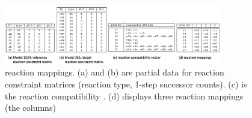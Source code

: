 \documentclass[webpdf,contemporary,large]{oup-authoring-template}
\newcommand{\revision}[1]{\color{red}{#1 }\color{black}}
\newcommand{\revisionb}[1]{\color{red}{#1}\color{black}}
\theoremstyle{thmstyleone}%
\theoremstyle{thmstyletwo}%
\theoremstyle{thmstylethree}%
\begin{document}
\begin{figure}
\centering
\includegraphics[width=0.85\textwidth,angle=0]{figures/constraint-data.png}
\caption{\revision{Illustration of calculating} reaction mappings.
(a) and (b) are partial data for reaction constraint matrices (reaction type, 1-step successor counts).
(c) is the reaction compatibility \revisionb{calculated from (a) and (b)}. (d) displays three reaction mappings (the columns) \revision{of the many reaction mappings; the reaction mappings are based on (c) and are obtained by selecting a unique 351 reaction in the list of compatible reactions for each 1034 reaction.}}
\label{fig:calculating-reaction-mappings}
\end{figure}
\end{document}
